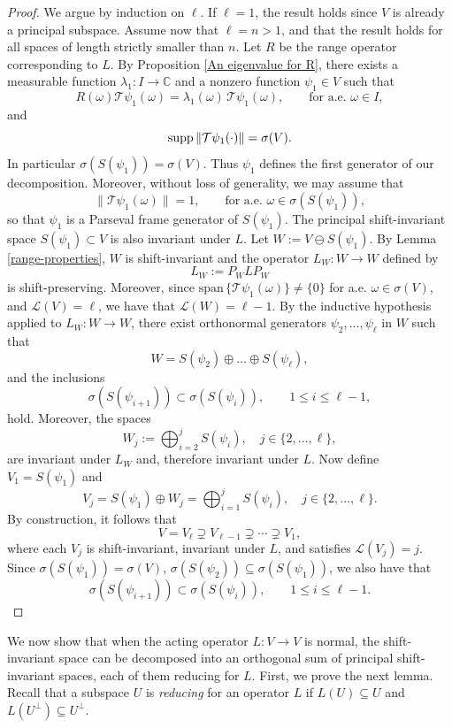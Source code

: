 \documentclass[a4paper,11pt]{amsart}
\theoremstyle{definition}
\theoremstyle{definition}
\def\la{\lambda}
\def\w{\omega}
\def\C{\mathbb{C}}
\def\ele{\mathcal{L}}
\newcommand{\supp}{{\rm supp\,}}
\begin{document}
	\begin{proof} We argue by induction on $\ell$.  If $\ell=1$, the result holds since $V$ is already a principal subspace.  
	Assume now that $\ell=n>1$, and that the result holds for all spaces of length strictly smaller than $n$. 
	Let $R$ be the range operator corresponding to $L$. By Proposition \ref{An eigenvalue for R}, 
	there exists a measurable function $\la_1 :I\to\C$ and a nonzero function $\psi_1\in V$ such that
	$$
	R(\omega)\mathcal T \psi_1(\omega) = \la_1(\omega)\,\mathcal T \psi_1(\omega), 
	\qquad \text{for a.e. }\omega \in I,
	$$
	and 
	$$
	\supp \|\mathcal T \psi_1(\cdot)\| = \sigma(V).
	$$
	In particular $\sigma(S(\psi_1))=\sigma(V)$. Thus $\psi_1$ defines the first generator of our decomposition. Moreover, without loss of generality, we may assume that
	$$
	\|\mathcal T\psi_1(\omega)\|=1, \qquad \text{for a.e. }\omega\in\sigma(S(\psi_1)),
	$$
	so that $\psi_1$ is a Parseval frame generator of $S(\psi_1)$.  
	The principal shift-invariant space
	$
	S(\psi_1)\subset V
	$
	is also invariant under $L$. Let $W:= V\ominus S(\psi_1)$. By Lemma \ref{range-properties}, $W$ is shift-invariant and the operator $L_W:W\to W$ defined by
	$$
	L_W := P_{W} L P_{W}
	$$
	is shift-preserving. Moreover, since $\text{span}\, \{ \mathcal{T} \psi_1 (\w) \}\neq \{0\}$ for a.e. $\w\in \sigma(V)$, and $\ele(V) = \ell$, we have that $\ele(W )= \ell-1$. 
	By the inductive hypothesis applied to $L_W:W\to W$, there exist orthonormal generators $\psi_2,\dots,\psi_\ell$ in $W$ such that
	$$
	W = S(\psi_2)\oplus\dots\oplus S(\psi_\ell),
	$$ 
	and the inclusions 
	$$
	\sigma(S(\psi_{i+1})) \subset \sigma(S(\psi_i)), \qquad 1\le i\le \ell-1,
	$$
	hold. Moreover, the spaces 
	$$
	W_j:= \bigoplus_{i=2}^j S(\psi_i), \quad  j\in \{2,\ldots,\ell\},
	$$
	are invariant under $L_W$ and, therefore invariant under $L$. Now define $V_1= S(\psi_1)$ and
	$$
	V_j= S(\psi_1) \oplus W_j=\bigoplus_{i=1}^{j} S(\psi_i), \quad  j\in \{2,\ldots,\ell\}.
	$$
	By construction, it follows that
	$$
	V = V_\ell \supsetneq V_{\ell-1} \supsetneq \cdots \supsetneq V_{1},
	$$
	where each $V_j$ is shift-invariant, invariant under $L$, and satisfies $\mathcal L(V_j)=j$. 
	Since  $\sigma(S(\psi_1))=\sigma(V)$,  $\sigma(S(\psi_2))\subseteq\sigma(S(\psi_1))$, we also have that
	$$
	\sigma(S(\psi_{i+1})) \subset \sigma(S(\psi_i)), \qquad 1\le i\le \ell-1.
	$$ 
\end{proof}

We now show that when the acting operator $L:V\to V$ is normal, the shift-invariant space can be decomposed into an orthogonal sum of principal shift-invariant spaces, each of them reducing for $L$. First, we prove the next lemma. Recall that a subspace $U$ is  \textit{reducing} for an operator $L$ if $L(U)\subseteq U$ and $L(U^\perp) \subseteq U^\perp$.
\end{document}
